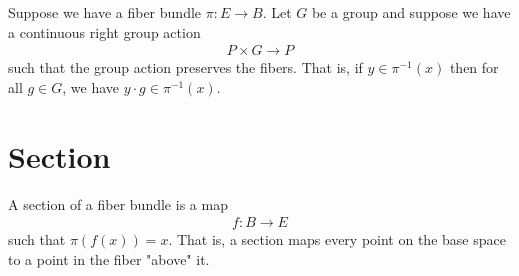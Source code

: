 \documentclass[book.tex]{subfiles}
\begin{document}

Suppose we have a fiber bundle $\pi: E \to B$. Let $G$ be a group and suppose we have a continuous right group action
\begin{align}
P \times G \to P
\end{align}
such that the group action preserves the fibers. That is, if $y \in \pi^{-1}(x)$ then for all $g \in G$, we have $y \cdot g \in \pi^{-1}(x)$.


\section{Section}

A section of a fiber bundle is a map
\begin{align}
    f: B \to E
\end{align}
such that $\pi(f(x)) = x$. That is, a section maps every point on the base space to a point in the fiber "above" it.

\end{document}
